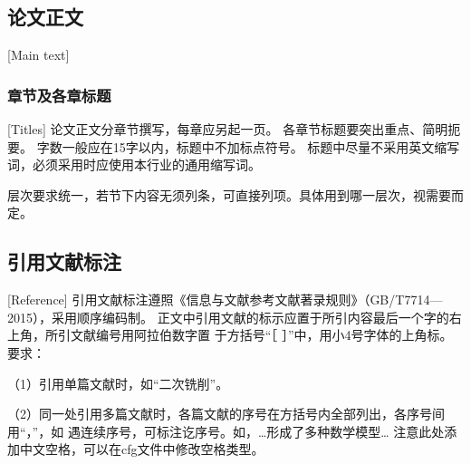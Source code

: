 












\subsection{论文正文}[Main text]
\subsubsection{章节及各章标题}[Titles]
论文正文分章节撰写，每章应另起一页。
各章节标题要突出重点、简明扼要。
字数一般应在15字以内，标题中不加标点符号。
标题中尽量不采用英文缩写词，必须采用时应使用本行业的通用缩写词。


层次要求统一，若节下内容无须列条，可直接列项。具体用到哪一层次，视需要而定。
\subsection{引用文献标注}[Reference]
引用文献标注遵照《信息与文献参考文献著录规则》（GB/T7714—2015），采用顺序编码制。
正文中引用文献的标示应置于所引内容最后一个字的右上角，所引文献编号用阿拉伯数字置
于方括号“［ ］”中，用小4号字体的上角标。
要求：

（1）引用单篇文献时，如“二次铣削\cite{cnproceed}”。

（2）同一处引用多篇文献时，各篇文献的序号在方括号内全部列出，各序号间用“，”，如
遇连续序号，可标注讫序号。如，…形成了多种数学模型\cite{cnarticle,cnproceed}…
注意此处添加中文空格，可以在cfg文件中修改空格类型。

